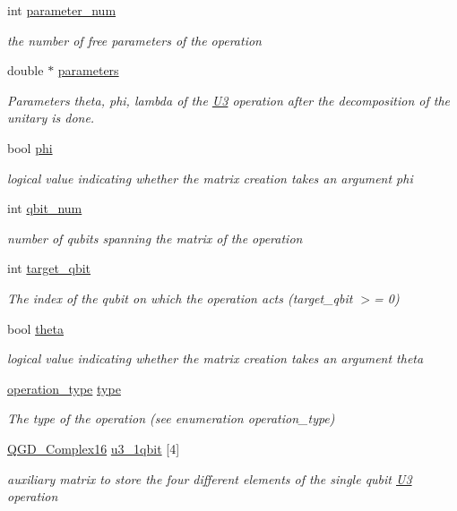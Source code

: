 \begin{DoxyCompactItemize}
int \hyperlink{class_operation_aa57505afe5b5ec27f6d053044b86e043}{parameter\+\_\+num}
\begin{DoxyCompactList}\small\item\em the number of free parameters of the operation \end{DoxyCompactList}\item 
double $\ast$ \hyperlink{class_u3_a6b07be37e63be67b306393a90d759f70}{parameters}
\begin{DoxyCompactList}\small\item\em Parameters theta, phi, lambda of the \hyperlink{class_u3}{U3} operation after the decomposition of the unitary is done. \end{DoxyCompactList}\item 
bool \hyperlink{class_u3_ac705d31d768b918da78d8b058ec6c6c3}{phi}
\begin{DoxyCompactList}\small\item\em logical value indicating whether the matrix creation takes an argument phi \end{DoxyCompactList}\item 
int \hyperlink{class_operation_aecd5fbf1dd4ea532b2e58471ff8bad69}{qbit\+\_\+num}
\begin{DoxyCompactList}\small\item\em number of qubits spanning the matrix of the operation \end{DoxyCompactList}\item 
int \hyperlink{class_operation_a3e489b72c124b494777c71b1646bb1e9}{target\+\_\+qbit}
\begin{DoxyCompactList}\small\item\em The index of the qubit on which the operation acts (target\+\_\+qbit $>$= 0) \end{DoxyCompactList}\item 
bool \hyperlink{class_u3_a2e53d6f8d744e64377408866bfa6c473}{theta}
\begin{DoxyCompactList}\small\item\em logical value indicating whether the matrix creation takes an argument theta \end{DoxyCompactList}\item 
\hyperlink{operations_2include_2_operation_8h_ad99e62941c8e4b13e5fc45ecaaf65eff}{operation\+\_\+type} \hyperlink{class_operation_ad47c56c86d62a4c775571e1600416479}{type}
\begin{DoxyCompactList}\small\item\em The type of the operation (see enumeration operation\+\_\+type) \end{DoxyCompactList}\item 
\hyperlink{struct_q_g_d___complex16}{Q\+G\+D\+\_\+\+Complex16} \hyperlink{class_u3_a1fe5b68f0d829ce4265007564c53414a}{u3\+\_\+1qbit} \mbox{[}4\mbox{]}
\begin{DoxyCompactList}\small\item\em auxiliary matrix to store the four different elements of the single qubit \hyperlink{class_u3}{U3} operation \end{DoxyCompactList}\end{DoxyCompactItemize}


